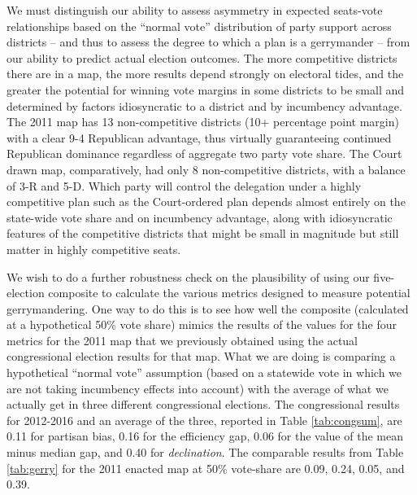 \par
    We must distinguish our ability to assess asymmetry in expected seats-vote relationships based on the ``normal vote'' distribution of party support across districts -- and thus to assess the degree to which a plan is a gerrymander -- from our ability to predict actual election outcomes. The more competitive districts there are in a map, the more results depend strongly on electoral tides, and the greater the potential for winning vote margins in some districts to be small and determined by factors idiosyncratic to a district and by incumbency advantage. The 2011 map has 13 non-competitive districts (10+ percentage point margin) with a clear 9-4 Republican advantage, thus virtually guaranteeing continued Republican dominance regardless of aggregate two party vote share. The Court drawn map, comparatively, had only 8 non-competitive districts, with a balance of 3-R and 5-D. Which party will control the delegation under a highly competitive plan such as the Court-ordered plan depends almost entirely on the state-wide vote share and on incumbency advantage, along with idiosyncratic features of the competitive districts that might be small in magnitude but still matter in highly competitive seats. 
\par
    We wish to do a further robustness check on the plausibility of using our five-election composite to calculate the various metrics designed to measure potential gerrymandering. One way to do this is to see how well the composite (calculated at a hypothetical 50\% vote share) mimics the results of the values for the four metrics for the 2011 map that we previously obtained using the actual congressional election results for that map. What we are doing is comparing a hypothetical ``normal vote'' \citep{Converse1966} assumption (based on a statewide vote in which we are not taking incumbency effects into account) with the average of what we actually get in three different congressional elections. The congressional results for 2012-2016 and an average of the three, reported in Table \ref{tab:congsum}, are 0.11 for partisan bias, 0.16 for the efficiency gap, 0.06 for the value of the mean minus median gap, and 0.40 for \textit{declination}. The comparable results from Table \ref{tab:gerry} for the 2011 enacted map at 50\% vote-share are 0.09, 0.24, 0.05, and 0.39.
